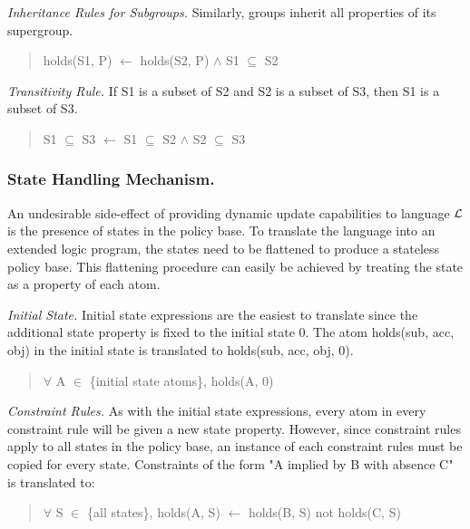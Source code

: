 \documentclass{llncs}
\begin{document}
        \emph{Inheritance Rules for Subgroups.} Similarly, groups inherit all
        properties of its supergroup.

        \begin{quote}
          holds(S1, P) $\leftarrow$ holds(S2, P) $\land$ S1 $\subseteq$ S2
        \end{quote}

        \emph{Transitivity Rule.} If S1 is a subset of S2 and S2 is a subset
        of S3, then S1 is a subset of S3.

        \begin{quote}
          S1 $\subseteq$ S3 $\leftarrow$ S1 $\subseteq$ S2 $\land$ S2
          $\subseteq$ S3
        \end{quote}

      \subsubsection{State Handling Mechanism.}

        An undesirable side-effect of providing dynamic update capabilities to
        language $\cal{L}$ is the presence of states in the policy base. To
        translate the language into an extended logic program, the states need
        to be flattened to produce a stateless policy base. This flattening
        procedure can easily be achieved by treating the state as a property
        of each atom. 

        \emph{Initial State.} Initial state expressions are the easiest to
        translate since the additional state property is fixed to the initial
        state 0. The atom holds(sub, acc, obj) in the initial state is
        translated to holds(sub, acc, obj, 0).

        \begin{quote}
          $\forall$ A $\in$ \{initial state atoms\}, holds(A, 0)
        \end{quote}

        \emph{Constraint Rules.} As with the initial state expressions, every
        atom in every constraint rule will be given a new state property.
        However, since constraint rules apply to all states in the policy
        base, an instance of each constraint rules must be copied for every
        state. Constraints of the form "A implied by B with absence C" is
        translated to:

        \begin{quote}
          $\forall$ S $\in$ \{all states\},
          holds(A, S) $\leftarrow$ holds(B, S) not holds(C, S)
        \end{quote}
\end{document}

